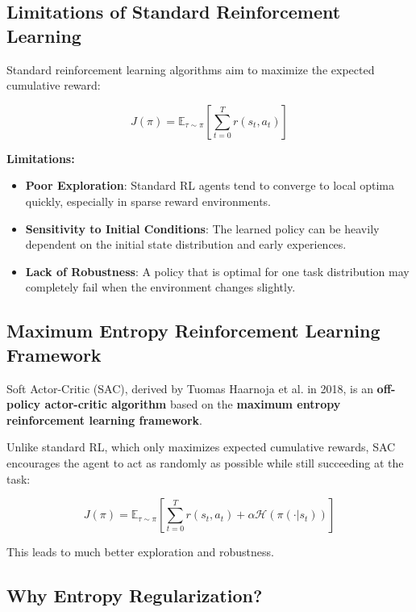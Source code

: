 \documentclass[12pt,a4paper]{article}
\theoremstyle{noteplain}
\theoremstyle{noteexercise}
\begin{document}
\subsection{Limitations of Standard Reinforcement Learning}\label{ssec:limitations}



Standard reinforcement learning algorithms aim to maximize the expected cumulative reward:

$$J(\pi) = \mathbb{E}_{\tau \sim \pi}\left[\sum_{t=0}^{T} r(s_t, a_t)\right]$$

\textbf{Limitations:}

\begin{itemize}
  \setlength{\itemsep}{0.3em}
  \item \textbf{Poor Exploration}: Standard RL agents tend to converge to local optima quickly, especially in sparse reward environments.
  \item \textbf{Sensitivity to Initial Conditions}: The learned policy can be heavily dependent on the initial state distribution and early experiences.
  \item \textbf{Lack of Robustness}: A policy that is optimal for one task distribution may completely fail when the environment changes slightly.
\end{itemize}



\subsection{Maximum Entropy Reinforcement Learning Framework}\label{ssec:maxent}



Soft Actor-Critic (SAC), derived by Tuomas Haarnoja et al. in 2018, is an \textbf{off-policy actor-critic algorithm} based on the \textbf{maximum entropy reinforcement learning framework}.

Unlike standard RL, which only maximizes expected cumulative rewards, SAC encourages the agent to act as randomly as possible while still succeeding at the task:

$$J(\pi) = \mathbb{E}_{\tau \sim \pi}\left[\sum_{t=0}^{T} r(s_t, a_t) + \alpha \mathcal{H}(\pi(\cdot|s_t))\right]$$

This leads to much better exploration and robustness.



\subsection{Why Entropy Regularization?}\label{ssec:why-entropy}
\end{document}

